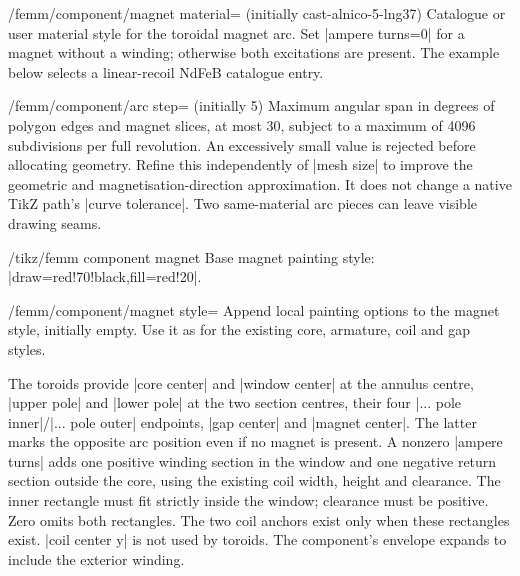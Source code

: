 \begin{key}{/femm/component/magnet material= (initially cast-alnico-5-lng37)}
Catalogue or user material style for the toroidal magnet arc. Set
|ampere turns=0| for a magnet without a winding; otherwise both excitations
are present. The example below selects a linear-recoil NdFeB catalogue entry.
\end{key}
\begin{key}{/femm/component/arc step= (initially 5)}
Maximum angular span in degrees of polygon edges and magnet slices, at most
30, subject to a maximum of 4096 subdivisions per full revolution.
An excessively small value is rejected before allocating geometry.
Refine this independently of |mesh size| to improve the geometric and
magnetisation-direction approximation. It does not change a native TikZ path's
|curve tolerance|. Two same-material arc pieces can leave visible drawing seams.
\end{key}
\begin{stylekey}{/tikz/femm component magnet}
Base magnet painting style: |draw=red!70!black,fill=red!20|.
\end{stylekey}
\begin{key}{/femm/component/magnet style=}
Append local painting options to the magnet style, initially empty.
Use it as for the existing core, armature, coil and gap styles.
\end{key}

The toroids provide |core center| and |window center| at the annulus centre,
|upper pole| and |lower pole| at the two section centres, their four
|... pole inner|/|... pole outer| endpoints, |gap center| and |magnet center|.
The latter marks the opposite arc position even if no magnet is present.
A nonzero |ampere turns| adds one positive winding section in the window and
one negative return section outside the core, using the existing coil width,
height and clearance. The inner rectangle must fit strictly inside the window;
clearance must be positive. Zero omits both rectangles. The two coil anchors
exist only when these rectangles exist. |coil center y| is not used by toroids.
The component's envelope expands to include the exterior winding.



\begin{codeexample}
\end{codeexample}

